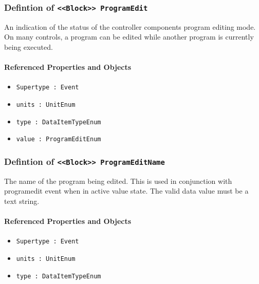 \subsubsection{Defintion of \texttt{<<Block>> ProgramEdit}}
  \label{type:ProgramEdit}

\FloatBarrier

An indication of the status of the controller components program editing mode. 
 On many controls, a program can be edited while another program is currently being executed.

\FloatBarrier
\paragraph{Referenced Properties and Objects}

\begin{itemize}
\item \texttt{Supertype : Event}

\item \texttt{units : UnitEnum}

\item \texttt{type : DataItemTypeEnum}

\item \texttt{value : ProgramEditEnum}

\end{itemize}
\FloatBarrier
\subsubsection{Defintion of \texttt{<<Block>> ProgramEditName}}
  \label{type:ProgramEditName}

\FloatBarrier

The name of the program being edited. 
 This is used in conjunction with programedit event when in active value state. 
 The valid data value must be a text string.

\FloatBarrier
\paragraph{Referenced Properties and Objects}

\begin{itemize}
\item \texttt{Supertype : Event}

\item \texttt{units : UnitEnum}

\item \texttt{type : DataItemTypeEnum}

\end{itemize}
\FloatBarrier
